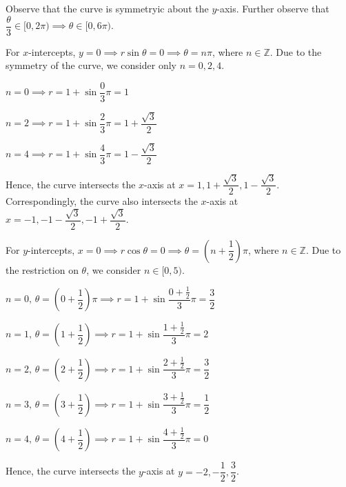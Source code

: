 \documentclass{jhwhw}
\begin{document}
    \solution
        Observe that the curve is symmetryic about the $y$-axis. Further observe that $\dfrac\theta3 \in [0, 2\pi) \implies \theta \in [0, 6\pi)$.
        
        For $x$-intercepts, $y = 0 \implies r\sin\theta = 0 \implies \theta = n\pi$, where $n \in \mathbb{Z}$. Due to the symmetry of the curve, we consider only $n = 0, 2, 4$.

         $n = 0 \implies r = 1 + \sin\dfrac03\pi = 1$
        
        \medskip

         $n = 2 \implies r = 1 + \sin\dfrac23\pi = 1 + \dfrac{\sqrt3}2$
        
        \medskip
        
         $n = 4 \implies r = 1 + \sin\dfrac43\pi = 1 - \dfrac{\sqrt3}2$

        Hence, the curve intersects the $x$-axis at $x = 1, 1 + \dfrac{\sqrt3}2, 1 - \dfrac{\sqrt3}2$. Correspondingly, the curve also intersects the $x$-axis at $x = -1, -1 - \dfrac{\sqrt3}2, -1 + \dfrac{\sqrt3}2$. 

        For $y$-intercepts, $x = 0 \implies r\cos\theta = 0 \implies \theta = \left(n + \dfrac12\right)\pi$, where $n \in \mathbb{Z}$. Due to the restriction on $\theta$, we consider $n \in [0, 5)$.

         $n = 0, \, \theta=\left(0 + \dfrac12\right)\pi \implies r = 1 + \sin\dfrac{0 + \frac12}3\pi = \dfrac32$

        \medskip

         $n = 1, \, \theta=\left(1 + \dfrac12\right)\implies r = 1 + \sin\dfrac{1 + \frac12}3\pi = 2$

        \medskip

         $n = 2, \, \theta=\left(2 + \dfrac12\right)\implies r = 1 + \sin\dfrac{2 + \frac12}3\pi = \dfrac32$

        \medskip

         $n = 3, \, \theta=\left(3 + \dfrac12\right)\implies r = 1 + \sin\dfrac{3 + \frac12}3\pi = \dfrac12$

        \medskip

         $n = 4, \, \theta=\left(4 + \dfrac12\right)\implies r = 1 + \sin\dfrac{4 + \frac12}3\pi = 0$

        Hence, the curve intersects the $y$-axis at $y = -2, -\dfrac12, \dfrac32$.
        
\end{document}
